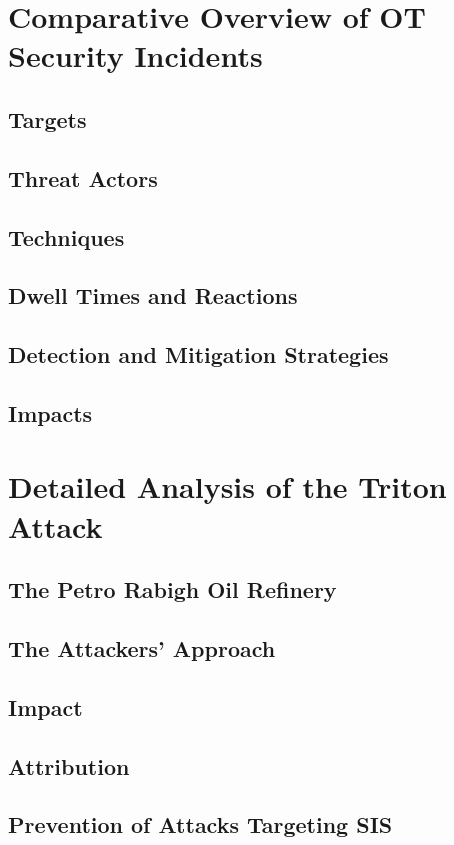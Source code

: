 \documentclass[runningheads]{llncs}
\begin{document}
\section{Comparative Overview of OT Security Incidents}
\subsection{Targets}
\subsection{Threat Actors}
\subsection{Techniques}
\subsection{Dwell Times and Reactions}
\subsection{Detection and Mitigation Strategies}
\subsection{Impacts}
\section{Detailed Analysis of the Triton Attack}
\subsection{The Petro Rabigh Oil Refinery}
\subsection{The Attackers' Approach}
\subsection{Impact}
\subsection{Attribution}
\subsection{Prevention of Attacks Targeting SIS}
\end{document}
